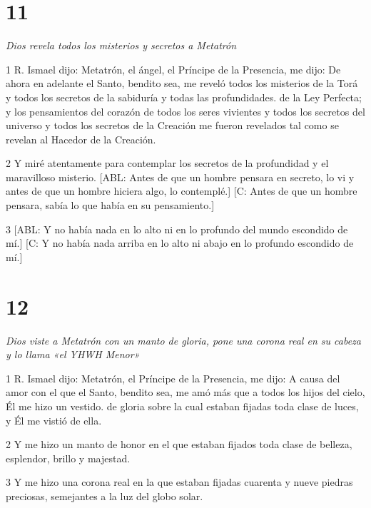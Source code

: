 \chapter{11}

\par \textit{Dios revela todos los misterios y secretos a Metatrón}

\par 1 R. Ismael dijo: Metatrón, el ángel, el Príncipe de la Presencia, me dijo: De ahora en adelante el Santo, bendito sea, me reveló todos los misterios de la Torá y todos los secretos de la sabiduría y todas las profundidades. de la Ley Perfecta; y los pensamientos del corazón de todos los seres vivientes y todos los secretos del universo y todos los secretos de la Creación me fueron revelados tal como se revelan al Hacedor de la Creación.

\par 2 Y miré atentamente para contemplar los secretos de la profundidad y el maravilloso misterio. [ABL: Antes de que un hombre pensara en secreto, lo vi y antes de que un hombre hiciera algo, lo contemplé.] [C: Antes de que un hombre pensara, sabía lo que había en su pensamiento.]

\par 3 [ABL: Y no había nada en lo alto ni en lo profundo del mundo escondido de mí.] [C: Y no había nada arriba en lo alto ni abajo en lo profundo escondido de mí.]

\chapter{12}

\par \textit{Dios viste a Metatrón con un manto de gloria, pone una corona real en su cabeza y lo llama «el YHWH Menor»}

\par 1 R. Ismael dijo: Metatrón, el Príncipe de la Presencia, me dijo: A causa del amor con el que el Santo, bendito sea, me amó más que a todos los hijos del cielo, Él me hizo un vestido. de gloria sobre la cual estaban fijadas toda clase de luces, y Él me vistió de ella.

\par 2 Y me hizo un manto de honor en el que estaban fijados toda clase de belleza, esplendor, brillo y majestad.

\par 3 Y me hizo una corona real en la que estaban fijadas cuarenta y nueve piedras preciosas, semejantes a la luz del globo solar.

